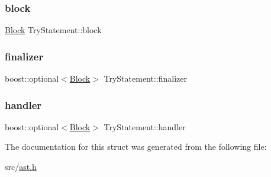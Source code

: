 \subsubsection{\texorpdfstring{block}{block}}
{\footnotesize\ttfamily \hyperlink{struct_block}{Block} Try\+Statement\+::block}

\mbox{\label{struct_try_statement_a1260e64a5438f82ea3d4be1fb9174c41}} 
\subsubsection{\texorpdfstring{finalizer}{finalizer}}
{\footnotesize\ttfamily boost\+::optional$<$\hyperlink{struct_block}{Block}$>$ Try\+Statement\+::finalizer}

\mbox{\label{struct_try_statement_afa043b0a35a0be28a40799cb4e703a12}} 
\subsubsection{\texorpdfstring{handler}{handler}}
{\footnotesize\ttfamily boost\+::optional$<$\hyperlink{struct_block}{Block}$>$ Try\+Statement\+::handler}



The documentation for this struct was generated from the following file\+:\begin{DoxyCompactItemize}
\item 
src/\hyperlink{ast_8h}{ast.\+h}\end{DoxyCompactItemize}
